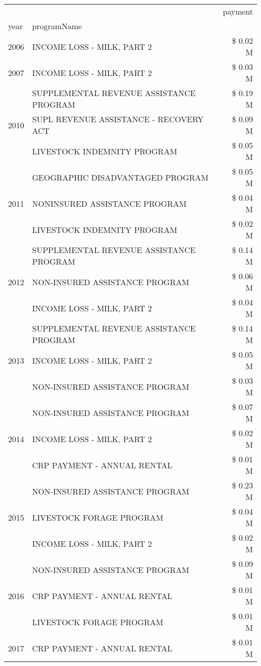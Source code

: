 \begin{tabular}{llr}
\toprule
 &  & payment \\
year & programName &  \\
\midrule
2006 & INCOME LOSS - MILK, PART 2 & \$ 0.02 M \\
\cline{1-3}
2007 & INCOME LOSS - MILK, PART 2 & \$ 0.03 M \\
\cline{1-3}
\multirow[t]{3}{*}{2010} & SUPPLEMENTAL REVENUE ASSISTANCE PROGRAM & \$ 0.19 M \\
 & SUPL REVENUE ASSISTANCE - RECOVERY ACT & \$ 0.09 M \\
 & LIVESTOCK INDEMNITY PROGRAM & \$ 0.05 M \\
\cline{1-3}
\multirow[t]{3}{*}{2011} & GEOGRAPHIC DISADVANTAGED PROGRAM & \$ 0.05 M \\
 & NONINSURED ASSISTANCE PROGRAM & \$ 0.04 M \\
 & LIVESTOCK INDEMNITY PROGRAM & \$ 0.02 M \\
\cline{1-3}
\multirow[t]{3}{*}{2012} & SUPPLEMENTAL REVENUE ASSISTANCE PROGRAM & \$ 0.14 M \\
 & NON-INSURED ASSISTANCE PROGRAM & \$ 0.06 M \\
 & INCOME LOSS - MILK, PART 2 & \$ 0.04 M \\
\cline{1-3}
\multirow[t]{3}{*}{2013} & SUPPLEMENTAL REVENUE ASSISTANCE PROGRAM & \$ 0.14 M \\
 & INCOME LOSS - MILK, PART 2 & \$ 0.05 M \\
 & NON-INSURED ASSISTANCE PROGRAM & \$ 0.03 M \\
\cline{1-3}
\multirow[t]{3}{*}{2014} & NON-INSURED ASSISTANCE PROGRAM & \$ 0.07 M \\
 & INCOME LOSS - MILK, PART 2 & \$ 0.02 M \\
 & CRP PAYMENT - ANNUAL RENTAL & \$ 0.01 M \\
\cline{1-3}
\multirow[t]{3}{*}{2015} & NON-INSURED ASSISTANCE PROGRAM & \$ 0.23 M \\
 & LIVESTOCK FORAGE PROGRAM & \$ 0.04 M \\
 & INCOME LOSS - MILK, PART 2 & \$ 0.02 M \\
\cline{1-3}
\multirow[t]{3}{*}{2016} & NON-INSURED ASSISTANCE PROGRAM & \$ 0.09 M \\
 & CRP PAYMENT - ANNUAL RENTAL & \$ 0.01 M \\
 & LIVESTOCK FORAGE PROGRAM & \$ 0.01 M \\
\cline{1-3}
\multirow[t]{3}{*}{2017} & CRP PAYMENT - ANNUAL RENTAL & \$ 0.01 M \\

\end{tabular}

